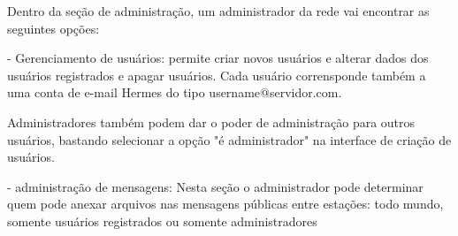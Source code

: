\documentclass[11pt,a4paper]{article}
\begin{document}


Dentro da seção de administração, um administrador da rede vai encontrar as seguintes opções:



- Gerenciamento de usuários: permite criar novos usuários e alterar dados dos usuários registrados e apagar usuários. Cada usuário corrensponde também a uma conta de e-mail Hermes do tipo username@servidor.com. 



Administradores também podem dar o poder de administração para outros usuários, bastando selecionar a opção "é administrador" na interface de criação de usuários.



- administração de mensagens: Nesta seção o administrador pode determinar quem pode anexar arquivos nas mensagens públicas entre estações: todo mundo, somente usuários registrados ou somente administradores

\end{document}
